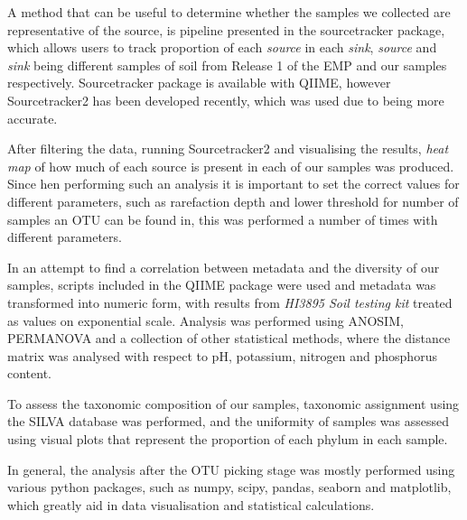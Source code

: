 \documentclass[12pt,twocolumn]{article} %
\begin{document}
\par
A method that can be useful to determine whether the samples we collected are representative of the source, is pipeline presented in the sourcetracker package\cite{Knights2011}, which allows users to track proportion of each \textit{source} in each \textit{sink}, \textit{source} and \textit{sink} being different samples of soil from Release 1 of the EMP and our samples respectively. Sourcetracker package is available with QIIME, however Sourcetracker2 has been developed recently, which was used due to being more accurate. 
\par
After filtering the data, running Sourcetracker2 and visualising the results, \textit{heat map} of how much of each source is present in each of our samples was produced. Since hen performing such an analysis it is important to set the correct values for different parameters, such as rarefaction depth and lower threshold for number of samples an OTU can be found in, this was performed a number of times with different parameters.
\par
In an attempt to find a correlation between metadata and the diversity of our samples, scripts included in the QIIME package were used and metadata was transformed into numeric form, with results from \textit{HI3895 Soil testing kit} treated as values on exponential scale. Analysis was performed using ANOSIM\cite{CLARKE1993}, PERMANOVA\cite{Tang2016} and a collection of other statistical methods, where the distance matrix was analysed with respect to pH, potassium, nitrogen and phosphorus content.
\par
To assess the taxonomic composition of our samples, taxonomic assignment using the SILVA\cite{Quast2012} database was performed, and the uniformity of samples was assessed using visual plots that represent the proportion of each phylum in each sample. 
\par
In general, the analysis after the OTU picking stage was mostly performed using various python packages, such as numpy, scipy, pandas, seaborn and matplotlib, which greatly aid in data visualisation and statistical calculations.
%
%
\end{document}
